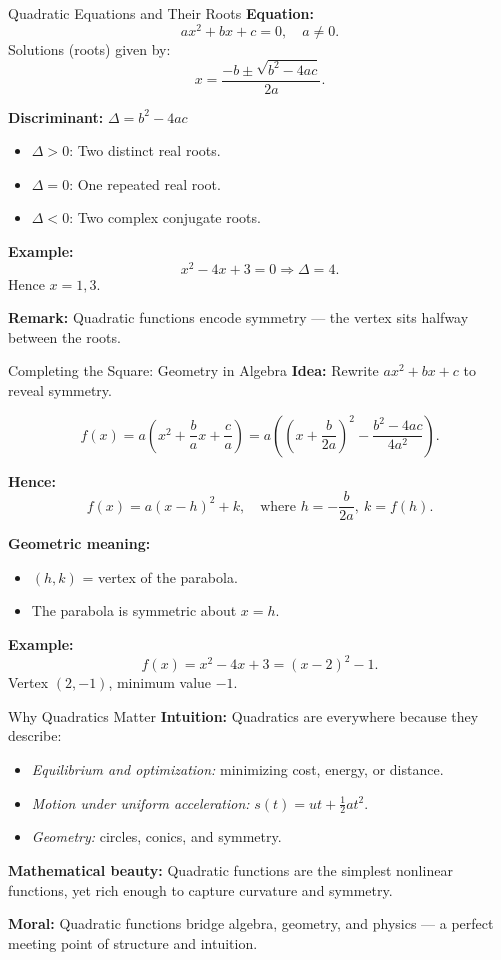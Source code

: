 \documentclass[11pt]{beamer}
\theoremstyle{plain}
\begin{document}
\begin{frame}{Quadratic Equations and Their Roots}
\textbf{Equation:}
\[
ax^2 + bx + c = 0, \quad a \neq 0.
\]
Solutions (roots) given by:
\[
x = \frac{-b \pm \sqrt{b^2 - 4ac}}{2a}.
\]

\textbf{Discriminant:} $\Delta = b^2 - 4ac$
\begin{itemize}
    \item $\Delta > 0$: Two distinct real roots.
    \item $\Delta = 0$: One repeated real root.
    \item $\Delta < 0$: Two complex conjugate roots.
\end{itemize}

\textbf{Example:}  
\[
x^2 - 4x + 3 = 0 \Rightarrow \Delta = 4.
\]
Hence $x = 1, 3$.

\textbf{Remark:}  
Quadratic functions encode symmetry — the vertex sits halfway between the roots.
\end{frame}

\begin{frame}{Completing the Square: Geometry in Algebra}
\textbf{Idea:} Rewrite $ax^2 + bx + c$ to reveal symmetry.

\[
f(x) = a\left(x^2 + \frac{b}{a}x + \frac{c}{a}\right)
     = a\left(\left(x + \frac{b}{2a}\right)^2 - \frac{b^2 - 4ac}{4a^2}\right).
\]

\textbf{Hence:}
\[
f(x) = a(x - h)^2 + k, \quad \text{where } h = -\frac{b}{2a}, \ k = f(h).
\]

\textbf{Geometric meaning:}
\begin{itemize}
    \item $(h,k)$ = vertex of the parabola.
    \item The parabola is symmetric about $x=h$.
\end{itemize}

\textbf{Example:}  
\[
f(x) = x^2 - 4x + 3 = (x-2)^2 - 1.
\]
Vertex $(2,-1)$, minimum value $-1$.
\end{frame}

\begin{frame}{Why Quadratics Matter}
\textbf{Intuition:}  
Quadratics are everywhere because they describe:
\begin{itemize}
    \item \emph{Equilibrium and optimization:} minimizing cost, energy, or distance.
    \item \emph{Motion under uniform acceleration:} $s(t) = ut + \frac{1}{2}at^2$.
    \item \emph{Geometry:} circles, conics, and symmetry.
\end{itemize}

\textbf{Mathematical beauty:}  
Quadratic functions are the simplest nonlinear functions, yet rich enough to capture curvature and symmetry.

\textbf{Moral:}  
Quadratic functions bridge algebra, geometry, and physics — a perfect meeting point of structure and intuition.
\end{frame}
\end{document}

